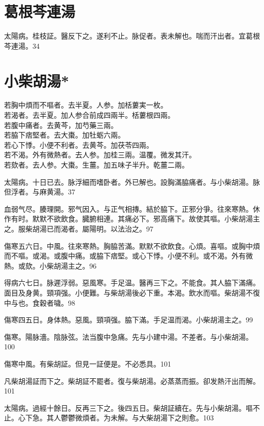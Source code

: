 \documentclass[b5paper,twoside,zihao=-4,UTF8]{ctexbook}
\begin{document}
\section{葛根芩連湯}

太陽病。桂枝証。醫反下之。遂利不止。脉促者。表未解也。喘而汗出者。宜葛根芩連湯。34

\section{小柴胡湯*}

若胸中煩而不嘔者。去半夏。人参。加栝蔞実一枚。\\
若渴者。去半夏。加人参合前成四兩半。栝蔞根四兩。\\
若腹中痛者。去黄芩，加芍藥三兩。\\
若脇下痞堅者。去大棗。加牡蛎六兩。\\
若心下悸。小便不利者。去黄芩。加茯苓四兩。\\
若不渴。外有微熱者。去人参。加桂三兩。温覆。微发其汗。\\
若欬者。去人参。大棗。生薑。加五味子半升。乾薑二兩。

太陽病。十日已去。脉浮細而嗜卧者。外已解也。設胸滿脇痛者。与小柴胡湯。脉{但}浮者。与麻黄湯。37

血弱气尽。腠理開。邪气因入。与正气相摶。結於脇下。正邪分爭。往來寒熱。休作有时。默默不欲飲食。臓腑相連。其痛必下。邪高痛下。故使其嘔。小柴胡湯主之。服柴胡湯已而渴者。屬陽明。以法治之。97

傷寒五六日。中風。往來寒熱。胸脇苦滿。默默不欲飲食。心煩。喜嘔。或胸中煩而不嘔。或渴。或腹中痛。或脇下痞堅。或心下悸。小便不利。或不渴。外有微熱。或欬。小柴胡湯主之。96

得病六七日。脉遲浮弱。惡風寒。手足温。醫再三下之。不能食。其人脇下滿{痛}。面目及身黄。頸項强。小便難。与柴胡湯後必下重。本渴。飲水而嘔。柴胡{湯}不復中与也。食穀者噦。98

傷寒四五日。身{体}熱。惡風。頸項强。脇下滿。手足温而渴。小柴胡湯主之。99

傷寒。陽脉濇。陰脉弦。法当腹中急痛。先与小建中湯。不差者。与小柴胡湯。100

傷寒中風。有柴胡証。但見一証便是。不必悉具。101

凡柴胡湯証而下之。柴胡証不罷者。復与柴胡湯。必蒸蒸而振。卻发熱汗出而解。101

太陽病。過經十餘日。反再三下之。後四五日。柴胡証續在。先与小柴胡湯。嘔不止。心下急。其人鬱鬱微煩者。为未解。与大柴胡湯下之則愈。103
\end{document}
